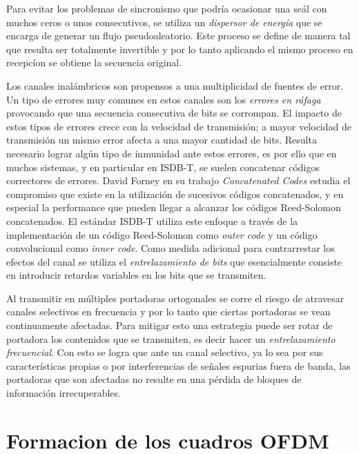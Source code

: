 Para evitar los problemas de sincronismo que podr\'ia ocasionar una se\'al con muchos ceros o unos consecutivos, se utiliza un \textit{dispersor de energ\'ia} que se encarga de generar un flujo pseudoaleatorio. Este proceso se define de manera tal que resulta ser totalmente invertible y por lo tanto aplicando el mismo proceso en recepc\'ion se obtiene la secuencia original.



Los canales inal\'ambricos son propensos a una multiplicidad de fuentes de error. Un tipo de errores muy comunes en estos canales son los \textit{errores en r\'afaga} provocando que una secuencia consecutiva de bits se corrompan. El impacto de estos tipos de errores crece con la velocidad de transmisi\'on; a mayor velocidad de transmisi\'on un mismo error afecta a una mayor cantidad de bits.
Resulta necesario lograr alg\'un tipo de inmunidad ante estos errores, es por ello que en muchos sistemas, y en particular en ISDB-T, se suelen concatenar c\'odigos correctores de errores. David Forney en su trabajo \textit{Concatenated Codes} \cite{forney1965concatenated} estudia el compromiso que existe en la utilizaci\'on de sucesivos c\'odigos concatenados, y en especial la performance que pueden llegar a alcanzar los c\'odigos Reed-Solomon concatenados.
El est\'andar ISDB-T utiliza este enfoque a trav\'es de la implementaci\'on de un c\'odigo Reed-Solomon como \textit{outer code} y un c\'odigo convolucional como \textit{inner code}.
Como medida adicional para contrarrestar los efectos del canal se utiliza el \textit{entrelazamiento de bits} que esencialmente consiste en introducir retardos variables en los bits que se transmiten.

Al transmitir en m\'ultiples portadoras ortogonales se corre el riesgo de atravesar canales selectivos en frecuencia y por lo tanto que ciertas portadoras se vean continuamente afectadas. Para mitigar esto una estrategia puede ser rotar de portadora los contenidos que se transmiten, es decir hacer un \textit{entrelazamiento frecuencial}. Con esto se logra que ante un canal selectivo, ya lo sea por sus caracter\'isticas propias o por interferencias de señales espurias fuera de banda, las portadoras que son afectadas no resulte en una p\'erdida de bloques de informaci\'on irrecuperables.


\section{Formacion de los cuadros OFDM}

